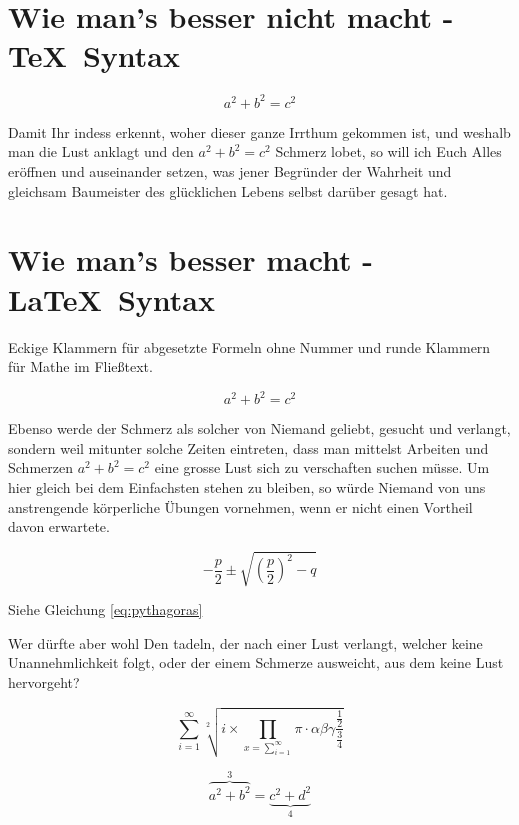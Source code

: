 \documentclass[12pt,ngerman,parskip=half]{scrartcl}
\begin{document}

\section{Wie man's besser nicht macht - \TeX\ Syntax}

$$ a^2 + b^2 = c^2 $$

Damit Ihr indess erkennt, woher dieser ganze Irrthum gekommen ist, und weshalb man die Lust anklagt und den $a^2 + b^2 = c^2$ Schmerz lobet, so will ich Euch Alles eröffnen und auseinander setzen, was jener Begründer der Wahrheit und gleichsam Baumeister des glücklichen Lebens selbst darüber gesagt hat. 

\section{Wie man's besser macht - \LaTeX\ Syntax}

Eckige Klammern für abgesetzte Formeln ohne Nummer und runde Klammern für Mathe im Fließtext.

\[ a^2 + b^2 = c^2 \]

Ebenso werde der Schmerz als solcher von Niemand geliebt, gesucht und verlangt, sondern weil mitunter solche Zeiten eintreten, dass man mittelst Arbeiten und Schmerzen \( a^2 + b^2 = c^2 \) eine grosse Lust sich zu verschaften suchen müsse. Um hier gleich bei dem Einfachsten stehen zu bleiben, so würde Niemand von uns anstrengende körperliche Übungen vornehmen, wenn er nicht einen Vortheil davon erwartete. 

\begin{equation}\label{eq:pythagoras}
-\frac{p}{2} \pm \sqrt{ \left(\frac{p}{2}\right)^2 -q }
\end{equation}

Siehe Gleichung \ref{eq:pythagoras}

Wer dürfte aber wohl Den tadeln, der nach einer Lust verlangt, welcher keine Unannehmlichkeit folgt, oder der einem Schmerze ausweicht, aus dem keine Lust hervorgeht?

\begin{equation}
\sum_{i=1}^{\infty} \sqrt[2\,]{i\times \prod_{x=\sum_{i=1}^{\infty}} \pi \cdot \alpha \beta \gamma 
\frac{\frac{1}{2}}{\frac{3}{4}}
}
\end{equation}

\begin{equation}
\overbrace{a^2+b^2}^3 = \underbrace{c^2 + d^2}_4
\end{equation}
\end{document}
